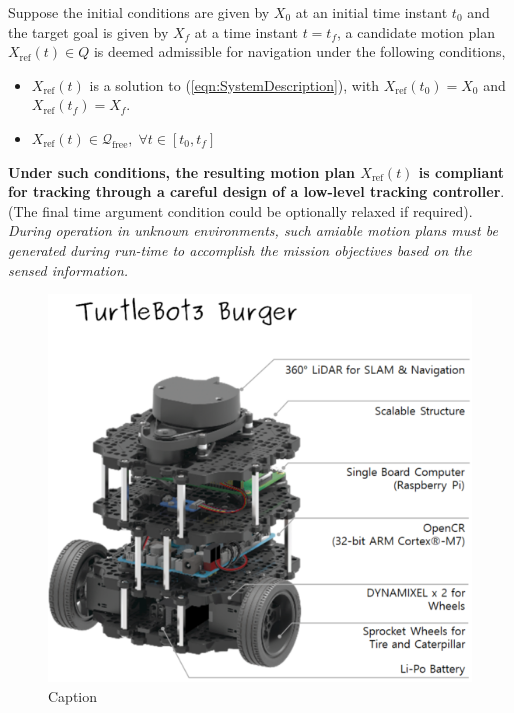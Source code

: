 \documentclass{article}
\begin{document}
Suppose the initial conditions are given by $X_0$ at an initial time instant $t_0$ and the target goal is given by $X_f$ at a time instant $t=t_f$, a candidate motion plan $X_{\text{ref}}(t) \in Q$ is deemed admissible for navigation under the following conditions,
\begin{itemize}
    \item $X_{\text{ref}}(t)$ is a solution to (\ref{eqn:SystemDescription}), with $X_{\text{ref}}(t_0) = X_0$ and $X_{\text{ref}}(t_f) = X_f$.
    \item $X_{\text{ref}}(t) \in \mathcal{Q}_{\text{free}},\; \forall t\in[t_0,t_f]$  
\end{itemize}
\textbf{Under such conditions, the resulting motion plan $X_{\text{ref}}(t)$ is compliant for tracking through a careful design of a low-level tracking controller}. (The final time argument condition could be optionally relaxed if required). \textit{During operation in unknown environments, such amiable motion plans must be generated during run-time to accomplish the mission objectives based on the sensed information.}
\begin{figure}
    \centering
    \includegraphics[width = 8 cm]{media/turtlebot3_burger_components.png}
    \caption{Caption}
    \label{fig:enter-label}
\end{figure}
\end{document}
